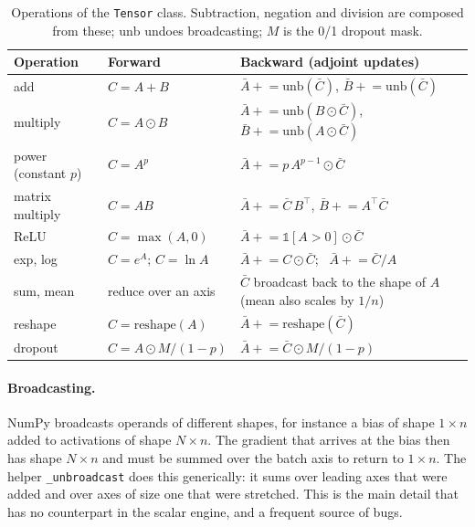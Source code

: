 \documentclass[11pt,a4paper]{article}
\newcommand{\code}[1]{\texttt{#1}}
\newcommand{\grad}[1]{\bar{#1}}
\begin{document}
\begin{table}[H]
\centering
\footnotesize
\begin{tabular}{@{}p{2.3cm}p{3.0cm}p{9.5cm}@{}}
\toprule
Operation & Forward & Backward (adjoint updates)\\
\midrule
add & $C=A+B$ & $\grad A \mathrel{+}= \mathrm{unb}(\grad C)$, $\grad B \mathrel{+}= \mathrm{unb}(\grad C)$\\
multiply & $C=A\odot B$ & $\grad A \mathrel{+}= \mathrm{unb}(B\odot\grad C)$, $\grad B \mathrel{+}= \mathrm{unb}(A\odot\grad C)$\\
power (constant $p$) & $C=A^{p}$ & $\grad A \mathrel{+}= p\,A^{p-1}\odot\grad C$\\
matrix multiply & $C=AB$ & $\grad A \mathrel{+}= \grad C\,B^{\top}$, $\grad B \mathrel{+}= A^{\top}\grad C$\\
ReLU & $C=\max(A,0)$ & $\grad A \mathrel{+}= \mathbb{1}[A>0]\odot\grad C$\\
exp, log & $C=e^{A}$; $C=\ln A$ & $\grad A \mathrel{+}= C\odot\grad C$; \ $\grad A \mathrel{+}= \grad C / A$\\
sum, mean & reduce over an axis & $\grad C$ broadcast back to the shape of $A$ (mean also scales by $1/n$)\\
reshape & $C=\mathrm{reshape}(A)$ & $\grad A \mathrel{+}= \mathrm{reshape}(\grad C)$\\
dropout & $C=A\odot M/(1-p)$ & $\grad A \mathrel{+}= \grad C\odot M/(1-p)$\\
\bottomrule
\end{tabular}
\caption{Operations of the \code{Tensor} class. Subtraction, negation and division are composed from these; $\mathrm{unb}$ undoes broadcasting; $M$ is the 0/1 dropout mask.}
\label{tab:ops}
\end{table}

\paragraph{Broadcasting.} NumPy broadcasts operands of different shapes, for instance a bias of shape $1\times n$ added to activations of shape $N\times n$. The gradient that arrives at the bias then has shape $N\times n$ and must be summed over the batch axis to return to $1\times n$. The helper \code{\_unbroadcast} does this generically: it sums over leading axes that were added and over axes of size one that were stretched. This is the main detail that has no counterpart in the scalar engine, and a frequent source of bugs.
\end{document}
